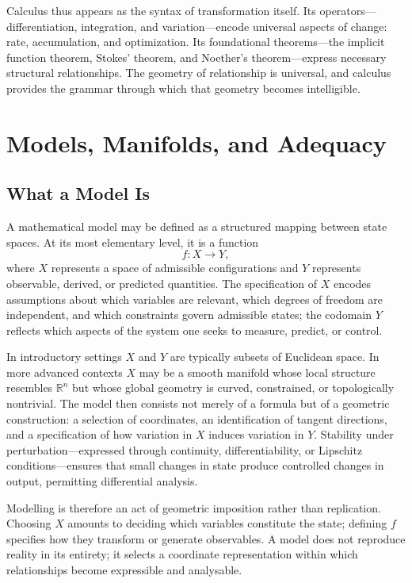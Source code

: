 \documentclass[12pt]{book}
\begin{document}
Calculus thus appears as the syntax of transformation itself. Its operators---differentiation, integration, and variation---encode universal aspects of change: rate, accumulation, and optimization. Its foundational theorems---the implicit function theorem, Stokes' theorem, and Noether's theorem---express necessary structural relationships. The geometry of relationship is universal, and calculus provides the grammar through which that geometry becomes intelligible.

\chapter{Models, Manifolds, and Adequacy}
\section{What a Model Is}

A mathematical model may be defined as a structured mapping between state
spaces. At its most elementary level, it is a function
\[
  f : X \to Y,
\]
where $X$ represents a space of admissible configurations and $Y$ represents
observable, derived, or predicted quantities. The specification of $X$ encodes
assumptions about which variables are relevant, which degrees of freedom are
independent, and which constraints govern admissible states; the codomain $Y$
reflects which aspects of the system one seeks to measure, predict, or control.

In introductory settings $X$ and $Y$ are typically subsets of Euclidean space.
In more advanced contexts $X$ may be a smooth manifold whose local structure
resembles $\mathbb{R}^n$ but whose global geometry is curved, constrained, or
topologically nontrivial. The model then consists not merely of a formula but
of a geometric construction: a selection of coordinates, an identification of
tangent directions, and a specification of how variation in $X$ induces
variation in $Y$. Stability under perturbation---expressed through
continuity, differentiability, or Lipschitz conditions---ensures that small
changes in state produce controlled changes in output, permitting differential
analysis.

Modelling is therefore an act of geometric imposition rather than replication.
Choosing $X$ amounts to deciding which variables constitute the state; defining
$f$ specifies how they transform or generate observables. A model does not
reproduce reality in its entirety; it selects a coordinate representation
within which relationships become expressible and analysable.
\end{document}
